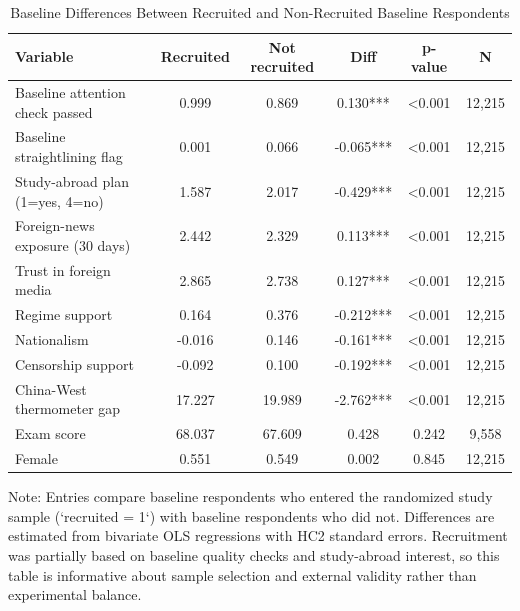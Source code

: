 \begin{table}[H]
\centering
\caption{Baseline Differences Between Recruited and Non-Recruited Baseline Respondents}
\label{tab:recruitment_selection}
\footnotesize
\begin{threeparttable}
\begin{tabular}{lccccc}
\toprule
Variable & Recruited & Not recruited & Diff & p-value & N \\
\midrule
Baseline attention check passed & 0.999 & 0.869 & 0.130*** & <0.001 & 12,215 \\
Baseline straightlining flag & 0.001 & 0.066 & -0.065*** & <0.001 & 12,215 \\
Study-abroad plan (1=yes, 4=no) & 1.587 & 2.017 & -0.429*** & <0.001 & 12,215 \\
Foreign-news exposure (30 days) & 2.442 & 2.329 & 0.113*** & <0.001 & 12,215 \\
Trust in foreign media & 2.865 & 2.738 & 0.127*** & <0.001 & 12,215 \\
Regime support & 0.164 & 0.376 & -0.212*** & <0.001 & 12,215 \\
Nationalism & -0.016 & 0.146 & -0.161*** & <0.001 & 12,215 \\
Censorship support & -0.092 & 0.100 & -0.192*** & <0.001 & 12,215 \\
China-West thermometer gap & 17.227 & 19.989 & -2.762*** & <0.001 & 12,215 \\
Exam score & 68.037 & 67.609 & 0.428 & 0.242 & 9,558 \\
Female & 0.551 & 0.549 & 0.002 & 0.845 & 12,215 \\
\bottomrule
\end{tabular}
\begin{tablenotes}[flushleft]
\footnotesize
\item Note: Entries compare baseline respondents who entered the randomized study sample (`recruited = 1`) with baseline respondents who did not. Differences are estimated from bivariate OLS regressions with HC2 standard errors. Recruitment was partially based on baseline quality checks and study-abroad interest, so this table is informative about sample selection and external validity rather than experimental balance.
\end{tablenotes}
\end{threeparttable}
\end{table}
